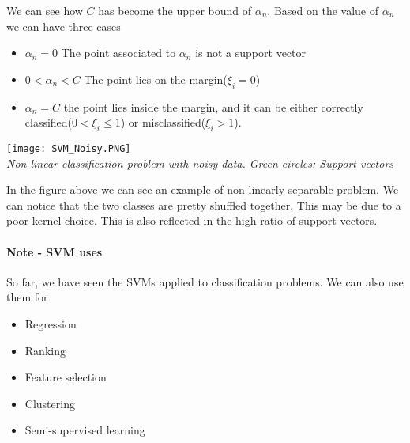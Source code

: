 \documentclass[main.tex]{subfiles}
\begin{document}
We can see how $C$ has become the upper bound of $\alpha_n$. Based on the value of $\alpha_n$ we can have three cases
\begin{itemize}
    \item $\alpha_n = 0$ The point associated to $\alpha_n$ is not a support vector
    \item $0 < \alpha_n < C$ The point lies on the margin($\xi_i = 0$)
    \item $\alpha_n = C$ the point lies inside the margin, and it can be either correctly classified($0 < \xi_i \leq 1$) or misclassified($\xi_i > 1$)\footnotemark. 
\end{itemize}
\begin{center}
    \texttt{[image: SVM\_Noisy.PNG]} \\
    \textit{Non linear classification problem with noisy data. Green circles: Support vectors}\\
\end{center}
In the figure above we can see an example of non-linearly separable problem. We can notice that the two classes are pretty shuffled together. This may be due to a poor kernel choice. This is also reflected in the high ratio of support vectors.
\paragraph{Note - SVM uses} So far, we have seen the SVMs applied to classification problems. We can also use them for
\begin{itemize}
    \item Regression
    \item Ranking
    \item Feature selection
    \item Clustering
    \item Semi-supervised learning
\end{itemize}

\newpage
\end{document}
